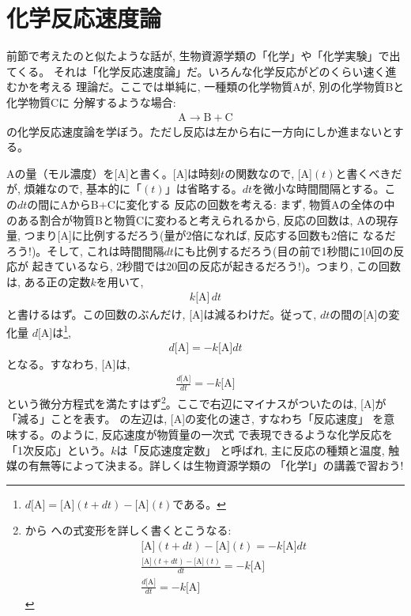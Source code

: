 \section{化学反応速度論}\label{sect:func_chemreact}

前節で考えたのと似たような話が, 生物資源学類の「化学」や「化学実験」で出てくる。
それは「化学反応速度論」だ。いろんな化学反応がどのくらい速く進むかを考える
理論だ。ここでは単純に, 一種類の化学物質Aが, 別の化学物質Bと化学物質Cに
分解するような場合:
\begin{eqnarray}\mbox{A} \longrightarrow \mbox{B}+\mbox{C}\label{eq:chem_react1}\end{eqnarray}
の化学反応速度論を学ぼう。ただし反応は左から右に一方向にしか進まないとする。

Aの量（モル濃度）を[A]と書く。[A]は時刻$t$の関数なので, [A]$(t)$と書くべきだが, 煩雑なので, 
基本的に「$(t)$」は省略する。$dt$を微小な時間間隔とする。この$dt$の間にAからB+Cに変化する
反応の回数を考える: まず, 物質Aの全体の中のある割合が物質Bと物質Cに変わると考えられるから, 
反応の回数は, Aの現存量, つまり[A]に比例するだろう(量が2倍になれば, 反応する回数も2倍に
なるだろう!)。そして, これは時間間隔$dt$にも比例するだろう(目の前で1秒間に10回の反応が
起きているなら, 2秒間では20回の反応が起きるだろう!)。つまり, この回数は, ある正の定数$k$を用いて, 
\begin{eqnarray}
k\mbox{[A]}\,dt\label{eq:chem_react12}
\end{eqnarray}
と書けるはず。この回数のぶんだけ, [A]は減るわけだ。従って, $dt$の間の[A]の変化量
$d\mbox{[A]}$は\footnote{$d\mbox{[A]}=\mbox{[A]}(t+dt)-\mbox{[A]}(t)$である。}, 
\begin{eqnarray}
d\mbox{[A]}=-k\mbox{[A]}dt\label{eq:chem_react13}
\end{eqnarray}
となる。すなわち, [A]は, 
\begin{eqnarray}
\frac{d\mbox{[A]}}{dt}=-k\mbox{[A]}\label{eq:diffeq_1_chem_react}
\end{eqnarray}
という微分方程式を満たすはず\footnote{から
への式変形を詳しく書くとこうなる:
\begin{eqnarray*}
&&\mbox{[A]}(t+dt)-\mbox{[A]}(t)=-k\mbox{[A]}dt\\
&&\frac{\mbox{[A]}(t+dt)-\mbox{[A]}(t)}{dt}=-k\mbox{[A]}\\
&&\frac{d\mbox{[A]}}{dt}=-k\mbox{[A]}
\end{eqnarray*}
}。ここで右辺にマイナスがついたのは, [A]が「減る」ことを表す。
の左辺は, [A]の変化の速さ, すなわち「反応速度」
を意味する。のように, 反応速度が物質量の一次式
で表現できるような化学反応を「1次反応」という。$k$は「反応速度定数」
と呼ばれ, 主に反応の種類と温度, 触媒の有無等によって決まる。詳しくは生物資源学類の
「化学I」の講義で習おう!\\


